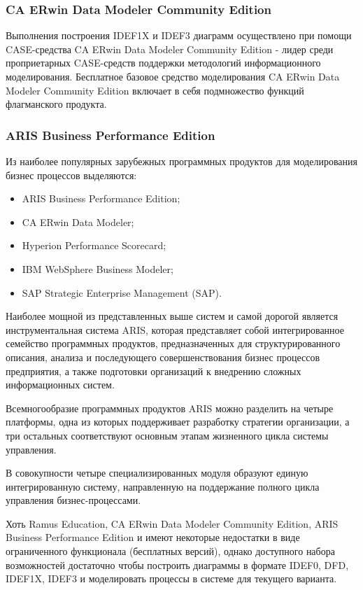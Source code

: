 \documentclass[a4paper,14pt]{extarticle}
\begin{document}
\subsubsection{CA ERwin Data Modeler Community Edition}
Выполнения построения IDEF1X и IDEF3 диаграмм осуществлено при помощи
CASE-средства CA ERwin Data Modeler Community Edition - лидер среди
проприетарных CASE-средств поддержки методологий информационного моделирования.
Бесплатное базовое средство моделирования CA ERwin Data Modeler Community
Edition включает в себя подмножество функций флагманского продукта.

\subsubsection{ARIS Business Performance Edition}
Из наиболее популярных зарубежных программных продуктов для моделирования бизнес
процессов выделяются:
\begin{itemize}
    \item ARIS Business Performance Edition;
    \item CA ERwin Data Modeler;
    \item Hyperion Performance Scorecard;
    \item IBM WebSphere Business Modeler;
    \item SAP Strategic Enterprise Management (SAP).
\end{itemize}

Наиболее мощной из представленных выше систем и самой дорогой является
инструментальная система ARIS, которая представляет собой интегрированное
семейство программных продуктов, предназначенных для структурированного
описания, анализа и последующего совершенствования бизнес процессов предприятия,
а также подготовки организаций к внедрению сложных информационных систем.

Всемногообразие программных продуктов ARIS можно разделить на четыре платформы,
одна из которых поддерживает разработку стратегии организации, а три остальных
соответствуют основным этапам жизненного цикла системы управления.

В совокупности четыре специализированных модуля образуют единую интегрированную
систему, направленную на поддержание полного цикла управления бизнес-процессами.


Хоть Ramus Education, CA ERwin Data Modeler Community Edition, ARIS Business
Performance Edition и имеют некоторые недостатки в виде ограниченного
функционала (бесплатных версий), однако доступного набора возможностей
достаточно чтобы построить диаграммы в формате IDEF0, DFD, IDEF1X, IDEF3 и
моделировать процессы в системе для текущего варианта.
\end{document}
